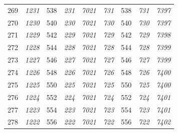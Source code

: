 \documentclass[10pt,fleqn]{article}
\begin{document}
\begin{longtable}{c|cccccccc}
269 & {\color{blue} \it 1231 \rm} & {\color{black} 538} & {\color{blue} \it 231 \rm} & {\color{blue} \it 7021 \rm} & {\color{blue} \it 731 \rm} & {\color{black} 538} & {\color{blue} \it 731 \rm} & {\color{blue} \it 7397 \rm} \\
270 & {\color{blue} \it 1230 \rm} & {\color{black} 540} & {\color{blue} \it 230 \rm} & {\color{blue} \it 7021 \rm} & {\color{blue} \it 730 \rm} & {\color{black} 540} & {\color{blue} \it 730 \rm} & {\color{blue} \it 7397 \rm} \\
271 & {\color{blue} \it 1229 \rm} & {\color{black} 542} & {\color{blue} \it 229 \rm} & {\color{blue} \it 7021 \rm} & {\color{blue} \it 729 \rm} & {\color{black} 542} & {\color{blue} \it 729 \rm} & {\color{blue} \it 7398 \rm} \\
272 & {\color{blue} \it 1228 \rm} & {\color{black} 544} & {\color{blue} \it 228 \rm} & {\color{blue} \it 7021 \rm} & {\color{blue} \it 728 \rm} & {\color{black} 544} & {\color{blue} \it 728 \rm} & {\color{blue} \it 7399 \rm} \\
273 & {\color{blue} \it 1227 \rm} & {\color{black} 546} & {\color{blue} \it 227 \rm} & {\color{blue} \it 7021 \rm} & {\color{blue} \it 727 \rm} & {\color{black} 546} & {\color{blue} \it 727 \rm} & {\color{blue} \it 7399 \rm} \\
274 & {\color{blue} \it 1226 \rm} & {\color{black} 548} & {\color{blue} \it 226 \rm} & {\color{blue} \it 7021 \rm} & {\color{blue} \it 726 \rm} & {\color{black} 548} & {\color{blue} \it 726 \rm} & {\color{blue} \it 7400 \rm} \\
275 & {\color{blue} \it 1225 \rm} & {\color{black} 550} & {\color{blue} \it 225 \rm} & {\color{blue} \it 7021 \rm} & {\color{blue} \it 725 \rm} & {\color{black} 550} & {\color{blue} \it 725 \rm} & {\color{blue} \it 7400 \rm} \\
276 & {\color{blue} \it 1224 \rm} & {\color{black} 552} & {\color{blue} \it 224 \rm} & {\color{blue} \it 7021 \rm} & {\color{blue} \it 724 \rm} & {\color{black} 552} & {\color{blue} \it 724 \rm} & {\color{blue} \it 7401 \rm} \\
277 & {\color{blue} \it 1223 \rm} & {\color{black} 554} & {\color{blue} \it 223 \rm} & {\color{blue} \it 7021 \rm} & {\color{blue} \it 723 \rm} & {\color{black} 554} & {\color{blue} \it 723 \rm} & {\color{blue} \it 7401 \rm} \\
278 & {\color{blue} \it 1222 \rm} & {\color{black} 556} & {\color{blue} \it 222 \rm} & {\color{blue} \it 7021 \rm} & {\color{blue} \it 722 \rm} & {\color{black} 556} & {\color{blue} \it 722 \rm} & {\color{blue} \it 7402 \rm} \\

\end{longtable}
\end{document}
